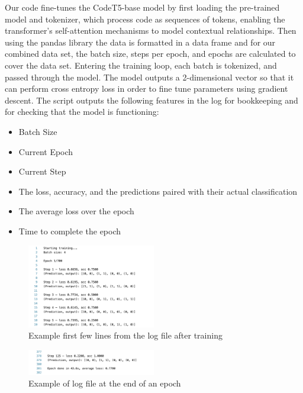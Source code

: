 \documentclass{article}
\begin{document}
Our code fine-tunes the CodeT5-base model by first loading the pre-trained model and tokenizer, which process code as sequences of tokens, enabling the transformer's self-attention mechanisms to model contextual relationships. Then using the pandas library the data is formatted in a data frame and for our combined data set, the batch size, steps per epoch, and epochs are calculated to cover the data set. Entering the training loop, each batch is tokenized, and passed through the model. The model outputs a 2-dimensional vector so that it can perform cross entropy loss in order to fine tune parameters using gradient descent. The script outputs the following features in the log for bookkeeping and for checking that the model is functioning:
\begin{itemize}
\item Batch Size
\item Current Epoch
\item Current Step
\item The loss, accuracy, and the predictions paired with their actual classification
\item The average loss over the epoch
\item Time to complete the epoch
\end{itemize}

\begin{figure}[htbp]
    \centering
    \includegraphics[width=0.5\textwidth]{images/training_log_example.png}
    \caption{Example first few lines from the log file after training}
    \label{fig:training_log_example}
\end{figure}

\begin{figure}[htbp]
    \centering
    \includegraphics[width=0.5\textwidth]{images/training_log_example2.png}
    \caption{Example of log file at the end of an epoch}
    \label{fig:training_log_example2}
\end{figure}
\bigskip
\end{document}
